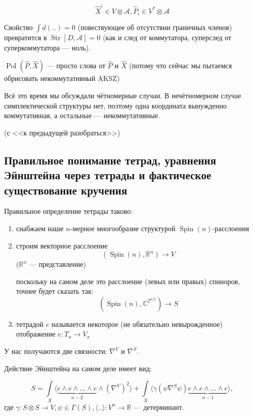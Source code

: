 \documentclass[11pt]{article}
\theoremstyle{remark}
\theoremstyle{definition}
\begin{document}
$$\hat X^i \in V \otimes \mathcal{A}, \hat P_i \in V^* \otimes \mathcal{A}$$

Свойство $\int d(..) = 0$ (повествующее об отсутствии граничных членов) превратится в $\operatorname{Str} [D, \mathcal{A}] = 0$ (как и след от коммутатора, суперслед от суперкоммутатора --- ноль).

$\operatorname{Pol} (\hat P, \hat X)$ --- просто слова от $\hat P$ и $\hat X$ (потому что сейчас мы пытаемся обрисовать некоммутативный AKSZ)

Всё это время мы обсуждали чётномерные случаи. В нечётномерном случае симплектической структуры нет, поэтому одна координата вынужденно коммутативная, а остальные --- некоммутативные.

(с <<к предыдущей разобраться>>)

\subsection{Правильное понимание тетрад, уравнения Эйнштейна через тетрады и фактическое существование кручения}

Правильное определение тетрады таково:

\begin{enumerate}
\item снабжаем наше $n$-мерное многообразие структурой $\operatorname{Spin}(n)$-расслоения
\item строим векторное расслоение $$(\operatorname{Spin}(n), \mathbb{R}^n) \to V$$ ($\mathbb{R}^n$ --- представление)

поскольку на самом деле это расслоение (левых или правых) спиноров, точнее будет сказать так:
$$(\operatorname{Spin}(n), \mathbb{C}^{2^{n/2}}) \to S$$

\item тетрадой $e$ называется некоторое (не обязательно невырожденное) отображение $e: T_x \to V_x$
\end{enumerate}

У нас получаются две связности: $\nabla^V$ и $\nabla^S$.

Действие Эйнштейна на самом деле имеет вид:

$$S = \int\limits_X \langle \underbrace{e \wedge e \wedge ... \wedge e}_{n-2} \wedge (\nabla^V)^2 \rangle + \int\limits_X \langle \gamma(\psi \nabla^S \psi) \underbrace{e \wedge e \wedge ... \wedge e}_{n-1}  \rangle, $$ где $\gamma: S\otimes S \to V, \psi\in \Gamma(S), \langle .. \rangle: V^n \to \mathbb{R}$ --- детерминант.
\end{document}
